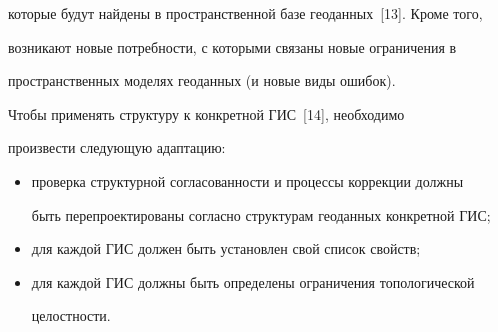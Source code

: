 которые будут найдены в пространственной базе геоданных~[13]. Кроме того, 


возникают новые потребности, с которыми связаны новые ограничения в 


пространственных моделях геоданных (и новые виды ошибок). 


    


    Чтобы применять структуру к конкретной ГИС~[14], необходимо 


произвести следующую адаптацию: 


    \begin{itemize} %


\item проверка структурной согласованности и процессы коррекции должны 


быть перепроектированы согласно структурам геоданных конкретной ГИС; 


\item для каждой ГИС должен быть установлен свой список свойств; 


\item для каждой ГИС должны быть определены ограничения топологической 


целостности. 


\end{itemize}








